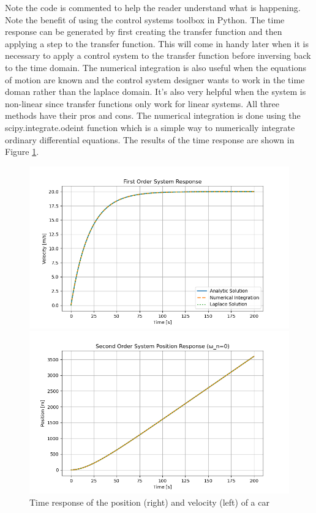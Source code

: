 Note the code is commented to help the reader understand what is happening. Note the benefit of using the control systems toolbox in Python. The time response can be generated by first creating the transfer function and then applying a step to the transfer function. This will come in handy later when it is necessary to apply a control system to the transfer function before inversing back to the time domain. The numerical integration is also useful when the equations of motion are known and the control system designer wants to work in the time doman rather than the laplace domain. It's also very helpful when the system is non-linear since transfer functions only work for linear systems. All three methods have their pros and cons. The numerical integration is done using the scipy.integrate.odeint function which is a simple way to numerically integrate ordinary differential equations. The results of the time response are shown in Figure \ref{f:car_response}.
\begin{figure}[H]
\centering
\begin{minipage}{0.48\textwidth}
\centering
\includegraphics[width=\linewidth]{Figures/car_velocity_response.png}
\end{minipage}\hfill
\begin{minipage}{0.48\textwidth}
\centering
\includegraphics[width=\linewidth]{Figures/car_position_response.png}
\end{minipage}
\caption{Time response of the position (right) and velocity (left) of a car}
\label{f:car_response}
\end{figure}
